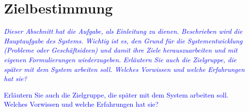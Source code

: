 
\section{Zielbestimmung}
\textcolor{blue}{\textit{Dieser Abschnitt hat die Aufgabe, als Einleitung zu dienen. Beschrieben wird die Hauptaufgabe des Systems. Wichtig ist es, den Grund für die Systementwicklung (Probleme oder Geschäftsideen) und damit ihre Ziele herauszuarbeiten und mit eigenen Formulierungen wiederzugeben.
Erläutern Sie auch die Zielgruppe, die später mit dem System arbeiten soll. Welches Vorwissen und welche Erfahrungen hat sie?
}}

\textcolor{blue}{Erläutern Sie auch die Zielgruppe, die später mit dem System arbeiten soll. Welches Vorwissen und welche Erfahrungen hat sie?}
